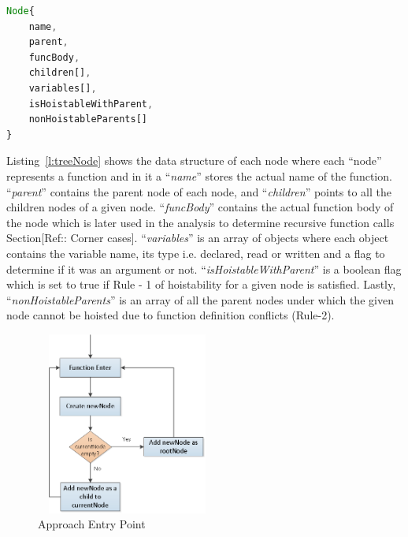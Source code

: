 \documentclass[authoryear,preprint]{sigplanconf}
\begin{document}
\lstset{numbers=left, numberstyle=\tiny, stepnumber=1, numbersep=5pt}
\lstset{basicstyle=\ttfamily}
\lstset{frame=tb, frame=bottomline}

\begin{lstlisting}[float,caption= TreeNode Structure ,label=l:treeNode,language=JavaScript]
Node{
	name,
	parent,
	funcBody,
	children[],
	variables[],
	isHoistableWithParent,
	nonHoistableParents[]
}

\end{lstlisting} 

Listing~\ref{l:treeNode} shows the data structure of each node where each \enquote{node} represents a function and in it a \enquote{\textit{name}} stores the actual name of the function. \enquote{\textit{parent}} contains the parent node of each node, and \enquote{\textit{children}} points to all the children nodes of a given node. \enquote{\textit{funcBody}} contains the actual function body of the node which is later used in the analysis to determine recursive function calls Section[Ref:: Corner cases]. \enquote{\textit{variables}} is an array of objects where each object contains the variable name, its type i.e. declared, read or written and a flag to determine if it was an argument or not. \enquote{\textit{isHoistableWithParent}} is a boolean flag which is set to true if Rule - 1 of hoistability for a given node is satisfied. Lastly, \enquote{\textit{nonHoistableParents}} is an array of all the parent nodes under which the given node cannot be hoisted due to function definition conflicts (Rule-2). \par

\begin{figure}[H]
  \centering
  \includegraphics[width=6cm, height=6cm]{approach1.png}
  \caption{Approach Entry Point}
  \label{fig:approach1}
\end{figure}
\end{document}
